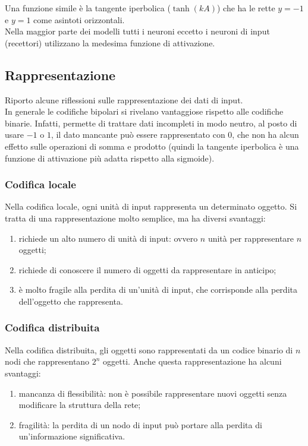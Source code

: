 Una funzione simile è la tangente iperbolica ($\tanh(kA)$) che ha le rette $y =
	-1$ e $y = 1$ come asintoti orizzontali.\\
Nella maggior parte dei modelli tutti i neuroni eccetto i neuroni di input
(recettori) utilizzano la medesima funzione di attivazione.

\subsection{Rappresentazione}

Riporto alcune riflessioni sulle rappresentazione dei dati di input.\\
In generale le codifiche bipolari si rivelano vantaggiose rispetto alle
codifiche binarie. Infatti, permette di trattare dati incompleti in modo neutro,
al posto di usare $-1$ o $1$, il dato mancante può essere rappresentato con $0$,
che non ha alcun effetto sulle operazioni di somma e prodotto (quindi la
tangente iperbolica è una funzione di attivazione più adatta rispetto alla
sigmoide).\\

\subsubsection{Codifica locale}

Nella codifica locale, ogni unità di input rappresenta un determinato oggetto.
Si tratta di una rappresentazione molto semplice, ma ha diversi svantaggi:
\begin{enumerate}
	\item richiede un alto numero di unità di input: ovvero $n$ unità per
	      rappresentare $n$ oggetti;

	\item richiede di conoscere il numero di oggetti da rappresentare in
	      anticipo;

	\item è molto fragile alla perdita di un'unità di input, che corrisponde
	      alla perdita dell'oggetto che rappresenta.
\end{enumerate}

\subsubsection{Codifica distribuita}

Nella codifica distribuita, gli oggetti sono rappresentati da un codice binario
di $n$ nodi che rappresentano $2^n$ oggetti. Anche questa rappresentazione ha
alcuni svantaggi:
\begin{enumerate}
	\item mancanza di flessibilità: non è possibile rappresentare nuovi oggetti
	      senza modificare la struttura della rete;

	\item fragilità: la perdita di un nodo di input può portare alla perdita
	      di un'informazione significativa.
\end{enumerate}

